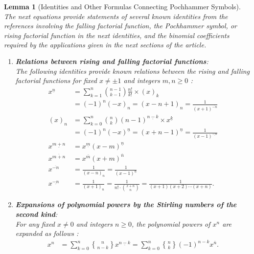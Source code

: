 \documentclass[12pt,reqno]{article}
\numberwithin{sfootnote}{section}
\numberwithin{equation}{section}
\newcommand{\itemlabel}[1]{\textbf{#1}: \\ }
\theoremstyle{DefaultTheoremStyle}
\newtheorem{lemma}[theorem]{Lemma}
\theoremstyle{definition}
\newcommand{\cf}[0]{cf.\ }
\newcommand{\gkpSII}[2]{\ensuremath{\genfrac{\{}{\}}{0pt}{}{#1}{#2}}}
\newcommand{\FFactII}[2]{\ensuremath{#1^{\underline{#2}}}}
\newcommand{\RFactII}[2]{\ensuremath{#1^{\overline{#2}}}}
\newcommand{\Pochhammer}[2]{\ensuremath{\left(#1\right)_{#2}}}
\begin{document}
\begin{lemma}[Identities and Other Formulas Connecting Pochhammer Symbols] 
\label{lemma_footnote_PHSymbol_BinomIdents} 
The next equations provide statements of several known identities 
from the references involving the 
falling factorial function, the Pochhammer symbol, 
or rising factorial function in the next identities, and the 
binomial coefficients required by the applications given in the 
next sections of the article. 
\begin{enumerate} 
     \setlength{\itemsep}{-2mm} 

\item \itemlabel{Relations between rising and falling factorial functions} 
The following identities provide known relations between the 
rising and falling factorial functions for fixed $x \neq \pm 1$ and 
integers $m,n \geq 0$ 
\citep[\S 4.1.2, \S 5; \cf \S 4.3.1]{UC} 
\citep[\S 2, Ex.\ 2.17, 2.9, 2.16; \S 5.3; \S 6, Ex.\ 6.31, p.\ 552]{GKP}: 
\begin{align*} 
\tag{\em Connection Formulas} 
\FFactII{x}{n} 
     & = 
     \sum_{k=1}^{n} 
     \binom{n-1}{k-1} \frac{n!}{k!} \times \Pochhammer{x}{k} \\ 
     & = 
     (-1)^{n} \Pochhammer{-x}{n} = 
     \Pochhammer{x-n+1}{n} = 
     \frac{1}{\RFactII{(x+1)}{-n}} \\ 
\Pochhammer{x}{n} 
     & = 
     \sum_{k=0}^{n} 
     \binom{n}{k} \FFactII{(n-1)}{n-k} \times \FFactII{x}{k} \\ 
     & = 
     (-1)^{n} \FFactII{(-x)}{n} = 
     \FFactII{(x+n-1)}{n} = 
     \frac{1}{\FFactII{(x-1)}{-n}} \\ 
\tag{\em Generalized Exponent Laws} 
\FFactII{x}{m+n} 
     & = 
     \FFactII{x}{m} \FFactII{(x-m)}{n} \\ 
\RFactII{x}{m+n} 
     & = 
     \RFactII{x}{m} \RFactII{(x+m)}{n} \\  
\tag{\em Negative Rising and Falling Powers} 
\RFactII{x}{-n} 
     & = 
     \frac{1}{\Pochhammer{x-n}{n}} = 
     \frac{1}{\FFactII{(x-1)}{n}} \\ 
\FFactII{x}{-n} 
     & = 
     \frac{1}{\Pochhammer{x+1}{n}} = 
     \frac{1}{n! \cdot \binom{x+n}{n}} = 
     \frac{1}{(x+1)(x+2) \cdots (x+n)}. 
\end{align*} 

\item \itemlabel{Expansions of polynomial powers by the 
                 Stirling numbers of the second kind} 
For any fixed $x \neq 0$ and integers $n \geq 0$, the 
polynomial powers of $x^n$ are expanded as follows 
\citep[\S 6.1]{GKP}: 
\begin{align*} 
\tag{\em Expansions of Polynomial Powers} 
x^{n} 
     & = 
     \sum_{k=0}^{n} \gkpSII{n}{n-k} \FFactII{x}{n-k} = %
     \sum_{k=0}^{n} \gkpSII{n}{k} (-1)^{n-k} \RFactII{x}{n}. 
\end{align*} 


\end{enumerate}
\end{lemma}
\end{document}
